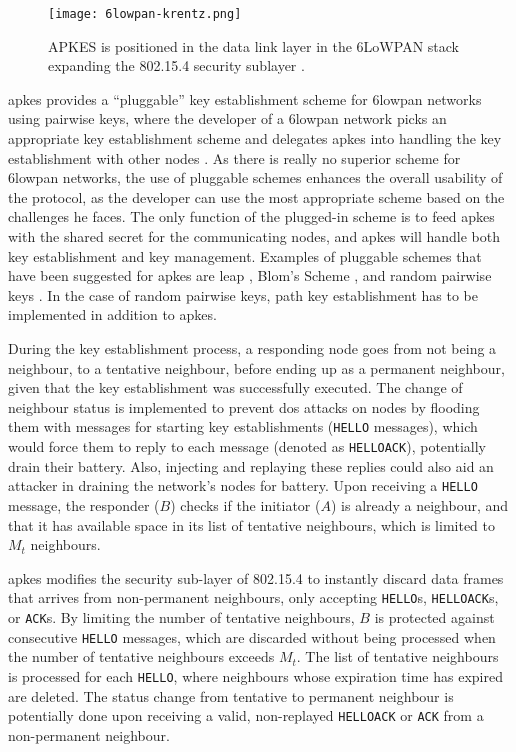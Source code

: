 \begin{figure}
	\centering
	\texttt{[image: 6lowpan-krentz.png]}
	\caption{APKES is positioned in the data link layer in the 6LoWPAN stack expanding the 802.15.4 security sublayer \cite{krentz20136lowpan}.}
	\label{fig:6lowpan-krentz}
\end{figure}

\gls{apkes} provides a ``pluggable'' key establishment scheme for \gls{6lowpan} networks using pairwise keys, where the developer of a \gls{6lowpan} network picks an appropriate key establishment scheme and delegates \gls{apkes} into handling the key establishment with other nodes \cite{krentz20136lowpan}. As there is really no superior scheme for \gls{6lowpan} networks, the use of pluggable schemes enhances the overall usability of the protocol, as the developer can use the most appropriate scheme based on the challenges he faces. The only function of the plugged-in scheme is to feed \gls{apkes} with the shared secret for the communicating nodes, and \gls{apkes} will handle both key establishment and key management. Examples of pluggable schemes that have been suggested for \gls{apkes} are \gls{leap} \cite{zhu2006leap+}, Blom's Scheme \cite{blom1984optimal}, and random pairwise keys \cite{chan2003random}. In the case of random pairwise keys, path key establishment has to be implemented in addition to \gls{apkes}.

During the key establishment process, a responding node goes from not being a neighbour, to a tentative neighbour, before ending up as a permanent neighbour, given that the key establishment was successfully executed. The change of neighbour status is implemented to prevent \gls{dos} attacks on nodes by flooding them with messages for starting key establishments (\texttt{HELLO} messages), which would force them to reply to each message (denoted as \texttt{HELLOACK}), potentially drain their battery. Also, injecting and replaying these replies could also aid an attacker in draining the network's nodes for battery. Upon receiving a \texttt{HELLO} message, the responder ($B$) checks if the initiator ($A$) is already a neighbour, and that it has available space in its list of tentative neighbours, which is limited to $M_t$ neighbours. 

\gls{apkes} modifies the security sub-layer of 802.15.4 to instantly discard data frames that arrives from non-permanent neighbours, only accepting \texttt{HELLO}s, \texttt{HELLOACK}s, or \texttt{ACK}s. By limiting the number of tentative neighbours, $B$ is protected against consecutive \texttt{HELLO} messages, which are discarded without being processed when the number of tentative neighbours exceeds $M_t$. The list of tentative neighbours is processed for each \texttt{HELLO}, where neighbours whose expiration time has expired are deleted. The status change from tentative to permanent neighbour is potentially done upon receiving a valid, non-replayed \texttt{HELLOACK} or \texttt{ACK} from a non-permanent neighbour.

